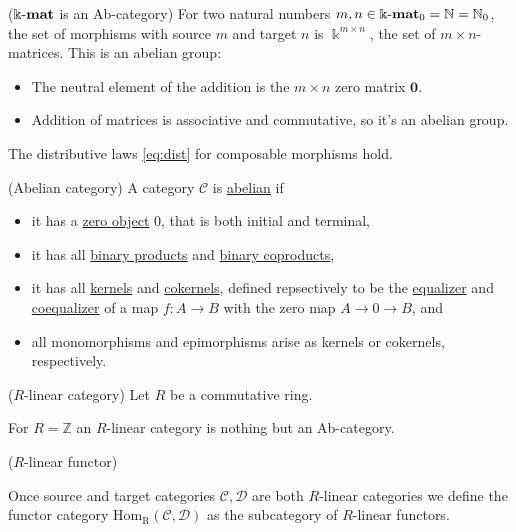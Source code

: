 \begin{example}{($\Bbbk\textnormal{-}\mathbf{mat}$ is an Ab-category)}
For two natural numbers $m,n \in {\Bbbk\textnormal{-}\mathbf{mat}}_{0} = \mathbb{N} = \mathbb{N}_{0}$, the set of morphisms with source $m$ and target $n$ is
$\Bbbk^{m\times n}$, the set of $m \times n$-matrices. This is an abelian group:
\begin{itemize}
\item The neutral element of the addition is the $m \times n$ zero matrix $\mathbf{0}$.
\item Addition of matrices is associative and commutative, so it's an abelian group.
\end{itemize}
The distributive laws \eqref{eq:dist} for composable morphisms hold.
\end{example}









\begin{definition}{(Abelian category)}
A category $\mathcal{C}$ is \ul{abelian} if
\begin{itemize}
\item it has a \ul{zero object} $0$, that is both initial and terminal,
\item it has all \ul{binary products} and \ul{binary coproducts},
\item it has all \ul{kernels} and \ul{cokernels}, defined repsectively to be the \ul{equalizer} and
\ul{coequalizer} of a map $f : A \rightarrow B$ with the zero map $A \rightarrow 0 \rightarrow B$, and
\item all monomorphisms and epimorphisms arise as kernels or cokernels, respectively.
\end{itemize}
\end{definition}

\begin{definition}{($R$-linear category)}
Let $R$ be a commutative ring.
\end{definition}

For $R = \mathbb{Z}$ an $R$-linear category is nothing but an Ab-category.

\begin{definition}{($R$-linear functor)}

\end{definition}

\begin{definition}
Once source and target categories $\mathcal{C}, \mathcal{D}$ are both $R$-linear categories we define the functor category
$\mathrm{Hom_{R}}(\mathcal{C},\mathcal{D})$ as the subcategory of $R$-linear functors.
\end{definition}



